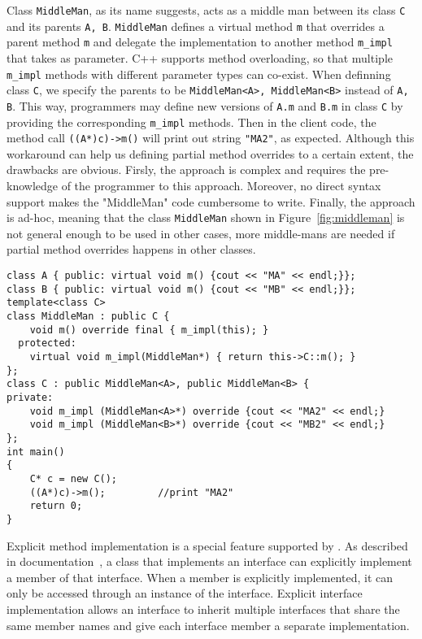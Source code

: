 Class \texttt{MiddleMan}, as its name suggests, acts as a middle man between its class \texttt{C} and its parents \texttt{A, B}. \texttt{MiddleMan} defines a virtual method \texttt{m} that overrides a parent method \texttt{m} and delegate the implementation to another method \texttt{m\_impl} that takes \kwthis as parameter. C++ supports method overloading, so that multiple \texttt{m\_impl} methods with different parameter types can co-exist. When definning class \texttt{C}, we specify the parents to be \texttt{MiddleMan<A>, MiddleMan<B>} instead of \texttt{A, B}. This way, programmers may define new versions of \texttt{A.m} and \texttt{B.m} in class \texttt{C} by providing the corresponding \texttt{m\_impl} methods. Then in the client code, the method call \texttt{((A*)c)->m()} will print out string \texttt{"MA2"}, as expected. Although this workaround can help us defining partial method overrides to a certain extent, the drawbacks are obvious. Firsly, the approach is complex and requires the pre-knowledge of the programmer to this approach. Moreover, no direct syntax support makes the "MiddleMan" code cumbersome to write. Finally, the approach is ad-hoc, meaning that the class \texttt{MiddleMan} shown in Figure~\ref{fig:middleman} is not general enough to be used in other cases, more middle-mans are needed if partial method overrides happens in other classes.

\begin{figure*}
\begin{lstlisting}
class A { public: virtual void m() {cout << "MA" << endl;}};
class B { public: virtual void m() {cout << "MB" << endl;}};
template<class C>
class MiddleMan : public C {
    void m() override final { m_impl(this); }
  protected:
    virtual void m_impl(MiddleMan*) { return this->C::m(); }
};
class C : public MiddleMan<A>, public MiddleMan<B> { 
private:
    void m_impl (MiddleMan<A>*) override {cout << "MA2" << endl;}
    void m_impl (MiddleMan<B>*) override {cout << "MB2" << endl;}
};
int main()
{
    C* c = new C();
    ((A*)c)->m();         //print "MA2"
    return 0;
}
\end{lstlisting}
\caption{The "MiddleMan" approach.}
\label{fig:middleman}
\end{figure*}

Explicit method implementation is a special feature supported by
\csharp{}. As described in \csharp{} documentation~\cite{csharpdoc}, a
class that implements an interface can explicitly implement a member
of that interface. When a member is explicitly implemented, it can
only be accessed through an instance of the interface. Explicit
interface implementation allows an interface to inherit multiple 
interfaces that share the same member names and give each interface
member a separate implementation.

